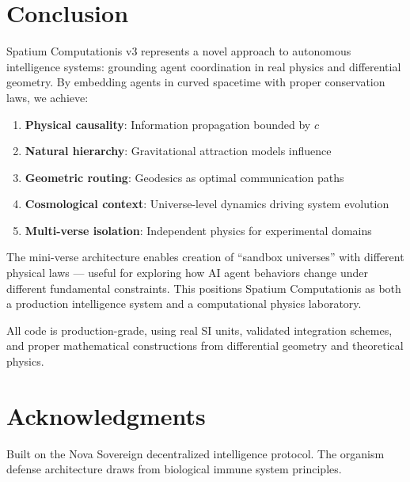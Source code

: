 \documentclass[12pt, a4paper]{article}
\begin{document}
\section{Conclusion}
\label{sec:conclusion}

Spatium Computationis v3 represents a novel approach to autonomous intelligence
systems: grounding agent coordination in real physics and differential geometry.
By embedding agents in curved spacetime with proper conservation laws, we achieve:

\begin{enumerate}
    \item \textbf{Physical causality}: Information propagation bounded by $c$
    \item \textbf{Natural hierarchy}: Gravitational attraction models influence
    \item \textbf{Geometric routing}: Geodesics as optimal communication paths
    \item \textbf{Cosmological context}: Universe-level dynamics driving system evolution
    \item \textbf{Multi-verse isolation}: Independent physics for experimental domains
\end{enumerate}

The mini-verse architecture enables creation of ``sandbox universes'' with
different physical laws — useful for exploring how AI agent behaviors change
under different fundamental constraints. This positions Spatium Computationis
as both a production intelligence system and a computational physics laboratory.

All code is production-grade, using real SI units, validated integration schemes,
and proper mathematical constructions from differential geometry and theoretical
physics.

\section*{Acknowledgments}

Built on the Nova Sovereign decentralized intelligence protocol. The organism
defense architecture draws from biological immune system principles.
\end{document}

